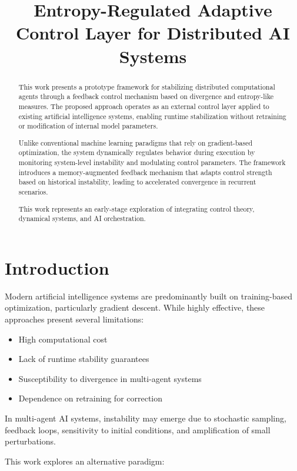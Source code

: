 \documentclass[11pt]{article}
\title{Entropy-Regulated Adaptive Control Layer for Distributed AI Systems}
\author{}
\date{}
\begin{document}
\maketitle

\begin{abstract}
This work presents a prototype framework for stabilizing distributed computational agents through a feedback control mechanism based on divergence and entropy-like measures. The proposed approach operates as an external control layer applied to existing artificial intelligence systems, enabling runtime stabilization without retraining or modification of internal model parameters.

Unlike conventional machine learning paradigms that rely on gradient-based optimization, the system dynamically regulates behavior during execution by monitoring system-level instability and modulating control parameters. The framework introduces a memory-augmented feedback mechanism that adapts control strength based on historical instability, leading to accelerated convergence in recurrent scenarios.

This work represents an early-stage exploration of integrating control theory, dynamical systems, and AI orchestration.
\end{abstract}

\section{Introduction}

Modern artificial intelligence systems are predominantly built on training-based optimization, particularly gradient descent. While highly effective, these approaches present several limitations:

\begin{itemize}
\item High computational cost
\item Lack of runtime stability guarantees
\item Susceptibility to divergence in multi-agent systems
\item Dependence on retraining for correction
\end{itemize}

In multi-agent AI systems, instability may emerge due to stochastic sampling, feedback loops, sensitivity to initial conditions, and amplification of small perturbations.

This work explores an alternative paradigm:
\end{document}

